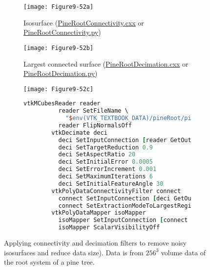 \begin{figure}[htb]
    \centering
	\begin{subfigure}[h]{0.48\linewidth}
		\texttt{[image: Figure9-52a]}
		\captionsetup{justification=centering}
		\caption{Isosurface (\href{https://lorensen.github.io/VTKExamples/site/Cxx/VisualizationAlgorithms/PineRootConnectivity/}{PineRootConnectivity.cxx} or \href{https://lorensen.github.io/VTKExamples/site/Python/VisualizationAlgorithms/PineRootConnectivity/}{PineRootConnectivity.py})}
		\label{fig:Figure9-52a}
	\end{subfigure}
	\hfill
	\begin{subfigure}[h]{0.48\linewidth}
		\texttt{[image: Figure9-52b]}
		\captionsetup{justification=centering}
		\caption{Largest connected surface (\href{https://lorensen.github.io/VTKExamples/site/Cxx/VisualizationAlgorithms/PineRootDecimation/}{PineRootDecimation.cxx} or \href{https://lorensen.github.io/VTKExamples/site/Python/VisualizationAlgorithms/PineRootDecimation/}{PineRootDecimation.py})}
        \label{fig:Figure9-52b}
	\end{subfigure}
	\hfill
	\begin{subfigure}[h]{0.96\linewidth}
		\texttt{[image: Figure9-52c]}
		\captionsetup{justification=centering}
		\caption*{}
        \label{fig:Figure9-52c}
	\end{subfigure}
	\begin{subfigure}[h]{0.96\linewidth}
        \begin{lstlisting}[language=TCL,  caption={}, numbers=none, frame=none]
        vtkMCubesReader reader
          reader SetFileName \
            "$env(VTK_TEXTBOOK_DATA)/pineRoot/pine_root.tri"
          reader FlipNormalsOff
        vtkDecimate deci
          deci SetInputConnection [reader GetOutputPort]
          deci SetTargetReduction 0.9
          deci SetAspectRatio 20
          deci SetInitialError 0.0005
          deci SetErrorIncrement 0.001
          deci SetMaximumIterations 6
          deci SetInitialFeatureAngle 30
        vtkPolyDataConnectivityFilter connect
          connect SetInputConnection [deci GetOutputPort]
          connect SetExtractionModeToLargestRegion
        vtkPolyDataMapper isoMapper
          isoMapper SetInputConnection [connect GetOutputPort]
          isoMapper ScalarVisibilityOff
        \end{lstlisting}
        \label{fig:Figure9-52d}
	\end{subfigure}
	\caption{Applying connectivity and decimation filters to remove noisy isosurfaces and reduce data size). Data is from $256^3$ volume data of the root system of a pine tree.}\label{fig:Figure9-52}
\end{figure}

